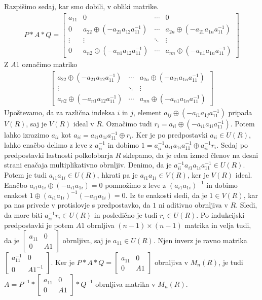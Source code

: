 \documentclass[mat1]{fmfdelo}
\begin{document}
\begin{dokaz}
	Razpišimo sedaj, kar smo dobili, v obliki matrike.
	\begin{align*}
		P*A*Q = \begin{bmatrix}
			a_{11} & 0 & \cdots & 0 \\
			0 & a_{22} \oplus (-a_{21}a_{12}a_{11}^{-1}) & \cdots & a_{2n} \oplus (-a_{21}a_{1n}a_{11}^{-1}) \\
			\vdots & \vdots & \ddots & \vdots \\
			0 & a_{n2} \oplus (-a_{n1}a_{12}a_{11}^{-1}) & \cdots & a_{nn} \oplus (-a_{n1}a_{1n}a_{11}^{-1})
		\end{bmatrix}
	\end{align*}
	Z $A1$ označimo matriko \begin{align*}
		\begin{bmatrix}
			a_{22} \oplus (-a_{21}a_{12}a_{11}^{-1}) & \cdots & a_{2n} \oplus (-a_{21}a_{1n}a_{11}^{-1}) \\
			\vdots & \ddots & \vdots \\
			a_{n2} \oplus (-a_{n1}a_{12}a_{11}^{-1}) & \cdots & a_{nn} \oplus (-a_{n1}a_{1n}a_{11}^{-1})
		\end{bmatrix}
	\end{align*}
Upoštevamo, da za različna indeksa $i$ in $j$, element $a_{ij} \oplus (-a_{i1}a_{1j}a_{11}^{-1})$ pripada $V(R)$, saj je $V(R)$ ideal v $R$. Označimo tudi $r_i = a_{ii} \oplus (-a_{i1}a_{1i}a_{11}^{-1})$. Potem lahko izrazimo $a_{ii}$ kot $a_{ii} = a_{i1}a_{1i}a_{11}^{-1} \oplus r_i$. Ker je po predpostavki $a_{ii}\in U(R)$, lahko enačbo delimo z leve z $a_{ii}^{-1}$ in dobimo $1 = a_{ii}^{-1}a_{i1}a_{1i}a_{11}^{-1} \oplus a_{ii}^{-1}r_i$. Sedaj po predpostavki lastnosti polkolobarja $R$ sklepamo, da je eden izmed členov na desni strani enačaja multiplikativno obrnljiv. Denimo, da je $a_{ii}^{-1}a_{i1}a_{1i}a_{11}^{-1}\in U(R)$. Potem je tudi $a_{i1}a_{1i}\in U(R)$, hkrati pa je $a_{i1}a_{1i}\in V(R)$, ker je $V(R)$ ideal. Enačbo $a_{i1}a_{1i} \oplus (- a_{i1}a_{1i}) = 0$ pomnožimo z leve z $(a_{i1}a_{1i})^{-1}$ in dobimo enakost $1 \oplus (a_{i1}a_{1i})^{-1}(-a_{i1}a_{1i}) = 0$. Iz te enakosti sledi, da je $1\in V(R)$, kar pa nas privede v protislovje s predpostavko, da $1$ ni aditivno obrnljiva v $R$. Sledi, da more biti $a_{ii}^{-1}r_i\in U(R)$ in posledično je tudi $r_i\in U(R)$. Po indukcijski predpostavki je potem $A1$ obrnljiva $(n-1)\times (n-1)$ matrika in velja tudi, da je $\begin{bmatrix}
	a_{11} & 0 \\
	0 & A1
\end{bmatrix}$ obrnljiva, saj je $a_{11}\in U(R)$. Njen inverz je ravno matrika $\begin{bmatrix}
a_{11}^{-1} & 0 \\
0 & A1^{-1}
\end{bmatrix}$. Ker je $P*A*Q = \begin{bmatrix}
a_{11} & 0 \\
0 & A1
\end{bmatrix}$ obrnljiva v $M_n(R)$, je tudi $A = P^{-1} * \begin{bmatrix}
a_{11} & 0 \\
0 & A1
\end{bmatrix} * Q^{-1}$ obrnljiva matrika v $M_n(R)$.
\end{dokaz}
\end{document}

